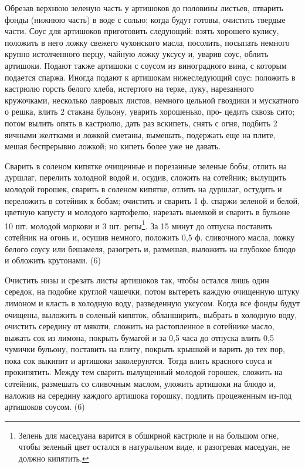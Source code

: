 
Обрезав верхнюю зеленую часть у артишоков до половины листьев, отварить фонды (нижнюю часть) в воде с солью; когда будут готовы, очистить твердые части. Соус для артишоков приготовить следующий: взять хорошего кулису, положить в него ложку свежего чухонского масла, посолить, посыпать немного крупно истолченного перцу, чайную ложку уксусу и, уварив соус, облить артишоки. Подают также артишоки с соусом из виноградного вина, с которым подается спаржа. Иногда подают к артишокам нижеследующий соус: положить в кастрюлю горсть белого хлеба, истертого на терке, луку, нарезанного кружочками, несколько лавровых листов, немного цельной гвоздики и мускатного о решка, влить 2 стакана бульону, уварить хорошенько, про- цедить сквозь сито; потом вылить опять в кастрюлю, дать раз вскипеть, снять с огня, подбить 2 яичными желтками и ложкой сметаны, вымешать, подержать еще на плите, мешая беспрерывно ложкой; но кипеть более уже не давать. 


Сварить в соленом кипятке очищенные и порезанные зеленые бобы, отлить на дуршлаг, перелить холодной водой и, осудив, сложить на сотейник; вылущить молодой горошек, сварить в соленом кипятке, отлить на дуршлаг, остудить и переложить в сотейник к бобам; очистить и сварить 1 ф. спаржи зеленой и белой, цветную капусту и молодого картофелю, нарезать выемкой и сварить в бульоне 10 шт. молодой моркови и 3 шт. репы\footnote{Зелень для маседуана варится в обширной кастрюле и на большом огне, чтобы зеленый цвет остался в натуральном виде, и разогревая маседуан, не должно кипятить.}. За 15 минут до отпуска поставить сотейник на огонь и, осушив немного, положить 0,5 ф. сливочного масла, ложку белого соусу или бешамеля, разогреть и, размешав, выложить на глубокое блюдо и обложить крутонами. (6) 


Очистить низы и срезать листы артишоков так, чтобы остался лишь один середок, на подобие круглой чашечки, потом вытереть каждую очищенную штуку лимоном и класть в холодную воду, разведенную уксусом. Когда все фонды будут очищены, выложить в соленый кипяток, обланширить, выбрать в холодную воду, очистить середину от мякоти, сложить на растопленное в сотейнике масло, выжать сок из лимона, покрыть бумагой и за 0,5 часа до отпуска влить 0,5 чумички бульону, поставить на плиту, покрыть крышкой и варить до тех пор, пока сок выкипит и артишоки заколеруются. Тогда влить красного соуса и прокипятить. Между тем сварить вылущенный молодой горошек, сложить на сотейник, размешать со сливочным маслом, уложить артишоки на блюдо и, наложив на середину каждого артишока горошку, подлить процеженным из-под артишоков соусом. (6) 

